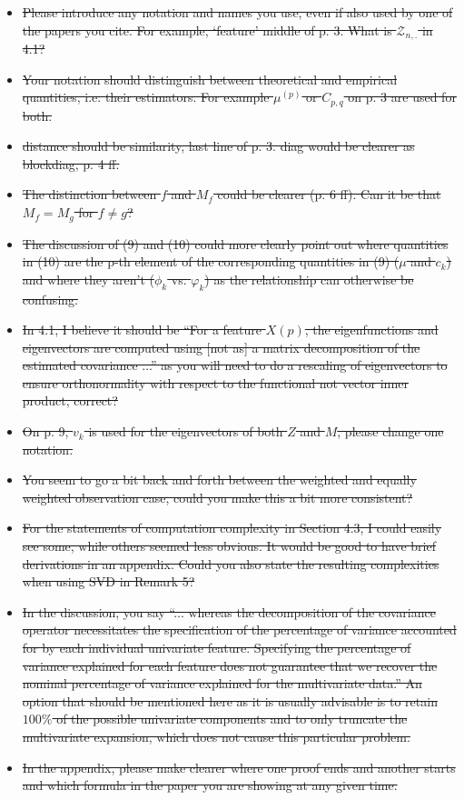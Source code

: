 \documentclass[11pt]{article}
\begin{document}
\begin{itemize}
  \item  \sout{Please introduce any notation and names you use, even if also used by one of the papers you cite. For example, ‘feature’ middle of p. 3. What is $\mathcal{Z}_{n,.}$ in 4.1?}
  \item \sout{Your notation should distinguish between theoretical and empirical quantities, i.e. their estimators. For example $\mu^{(p)}$ or $C_{p,q}$ on p. 3 are used for both.}
  \item \sout{distance should be similarity, last line of p. 3. diag would be clearer as blockdiag, p. 4 ff.}
  \item \sout{The distinction between $f$ and $M_f$ could be clearer (p. 6 ff). Can it be that $M_f = M_g$ for $f \neq g$?}
  \item \sout{The discussion of (9) and (10) could more clearly point out where quantities in (10) are the p-th element of the corresponding quantities in (9) ($\mu$ and $c_k$) and where they aren't ($\phi_k$ vs. $\varphi_k$) as the relationship can otherwise be confusing.}
  \item \sout{In 4.1, I believe it should be “For a feature $X(p)$, the eigenfunctions and eigenvectors are computed using [not as] a matrix decomposition of the estimated covariance ...” as you will need to do a rescaling of eigenvectors to ensure orthonormality with respect to the functional not vector inner product, correct?}
  \item \sout{On p. 9, $v_k$ is used for the eigenvectors of both $Z$ and $M$, please change one notation.}
  \item \sout{You seem to go a bit back and forth between the weighted and equally weighted observation case, could you make this a bit more consistent?}
  \item \sout{For the statements of computation complexity in Section 4.3, I could easily see some, while others seemed less obvious. It would be good to have brief derivations in an appendix. Could you also state the resulting complexities when using SVD in Remark 5?}
  \item \sout{In the discussion, you say “... whereas the decomposition of the covariance operator necessitates the specification of the percentage of variance accounted for by each individual univariate feature. Specifying the percentage of variance explained for each feature does not guarantee that we recover the nominal percentage of variance explained for the multivariate data.” An option that should be mentioned here as it is usually advisable is to retain $100\%$ of the possible univariate components and to only truncate the multivariate expansion, which does not cause this particular problem.}
  \item \sout{In the appendix, please make clearer where one proof ends and another starts and which formula in the paper you are showing at any given time.}
\end{itemize}
\end{document}
